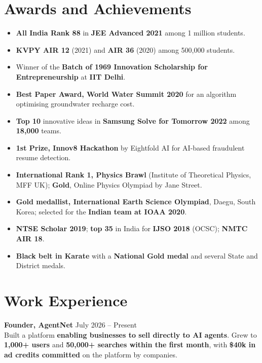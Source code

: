 \documentclass[letterpaper,10pt]{article}
\newcommand{\entry}[3]{%
  \textbf{#1} \hfill #2 \\[1pt]
  #3\par\vspace{2pt}}
\begin{document}
\section{Awards and Achievements}
\begin{itemize}
    \item \textbf{All India Rank 88} in \textbf{JEE Advanced 2021} among 1 million students.
    \item \textbf{KVPY AIR 12} (2021) and \textbf{AIR 36} (2020) among 500,000 students.
    \item Winner of the \textbf{Batch of 1969 Innovation Scholarship for Entrepreneurship} at \textbf{IIT Delhi}.
    \item \textbf{Best Paper Award, World Water Summit 2020} for an algorithm optimising groundwater recharge cost.
    \item \textbf{Top 10} innovative ideas in \textbf{Samsung Solve for Tomorrow 2022} among \textbf{18,000} teams.
    \item \textbf{1st Prize, Innov8 Hackathon} by Eightfold AI for AI-based fraudulent resume detection.
    \item \textbf{International Rank 1, Physics Brawl} (Institute of Theoretical Physics, MFF UK); \textbf{Gold}, Online Physics Olympiad by Jane Street.
    \item \textbf{Gold medallist, International Earth Science Olympiad}, Daegu, South Korea; selected for the \textbf{Indian team at IOAA 2020}.
    \item \textbf{NTSE Scholar 2019}; \textbf{top 35} in India for \textbf{IJSO 2018} (OCSC); \textbf{NMTC AIR 18}.
    \item \textbf{Black belt in Karate} with a \textbf{National Gold medal} and several State and District medals.
\end{itemize}

\section{Work Experience}

\entry{Founder, AgentNet}{July 2026 -- Present}{%
Built a platform \textbf{enabling businesses to sell directly to AI agents}. Grew to \textbf{1,000+ users} and \textbf{50,000+ searches within the first month}, with \textbf{\$40k in ad credits committed} on the platform by companies.}
\end{document}
